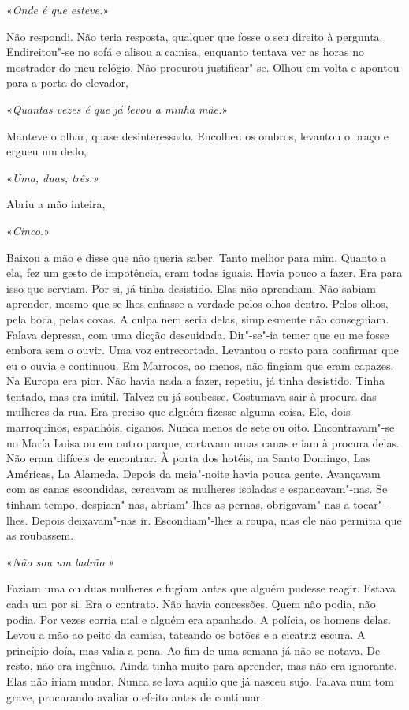 «\emph{Onde é que esteve.}»

Não respondi. Não teria resposta, qualquer que fosse o seu direito à
pergunta. Endireitou"-se no sofá e alisou a camisa, enquanto tentava ver
as horas no mostrador do meu relógio. Não procurou justificar"-se. Olhou
em volta e apontou para a porta do elevador,

«\emph{Quantas vezes é que já levou a minha mãe.}»

Manteve o olhar, quase desinteressado. Encolheu os ombros, levantou o
braço e ergueu um dedo,

«\emph{Uma, duas, três.»}

Abriu a mão inteira,

«\emph{Cinco.}»

Baixou a mão e disse que não queria saber. Tanto melhor para mim. Quanto
a ela, fez um gesto de impotência, eram todas iguais. Havia pouco a
fazer. Era para isso que serviam. Por si, já tinha desistido. Elas não
aprendiam. Não sabiam aprender, mesmo que se lhes enfiasse a verdade
pelos olhos dentro. Pelos olhos, pela boca, pelas coxas. A culpa nem
seria delas, simplesmente não conseguiam. Falava depressa, com uma
dicção descuidada. Dir"-se"-ia temer que eu me fosse embora sem o ouvir.
Uma voz entrecortada. Levantou o rosto para confirmar que eu o ouvia e
continuou. Em Marrocos, ao menos, não fingiam que eram capazes. Na
Europa era pior. Não havia nada a fazer, repetiu, já tinha desistido.
Tinha tentado, mas era inútil. Talvez eu já soubesse. Costumava sair à
procura das mulheres da rua. Era preciso que alguém fizesse alguma
coisa. Ele, dois marroquinos, espanhóis, ciganos. Nunca menos de sete ou
oito. Encontravam"-se no María Luisa ou em outro parque, cortavam umas
canas e iam à procura delas. Não eram difíceis de encontrar. À porta dos
hotéis, na Santo Domingo, Las Américas, La Alameda. Depois da
meia"-noite havia pouca gente. Avançavam com as canas escondidas,
cercavam as mulheres isoladas e espancavam"-nas. Se tinham tempo,
despiam"-nas, abriam"-lhes as pernas, obrigavam"-nas a tocar"-lhes.
Depois deixavam"-nas ir. Escondiam"-lhes a roupa, mas ele não permitia
que as roubassem.

«\emph{Não sou um ladrão.»}

Faziam uma ou duas mulheres e fugiam antes que alguém pudesse reagir.
Estava cada um por si. Era o contrato. Não havia concessões. Quem não
podia, não podia. Por vezes corria mal e alguém era apanhado. A polícia,
os homens delas. Levou a mão ao peito da camisa, tateando os botões e a
cicatriz escura. A princípio doía, mas valia a pena. Ao fim de uma
semana já não se notava. De resto, não era ingênuo. Ainda tinha muito
para aprender, mas não era ignorante. Elas não iriam mudar. Nunca se
lava aquilo que já nasceu sujo. Falava num tom grave, procurando avaliar
o efeito antes de continuar.

